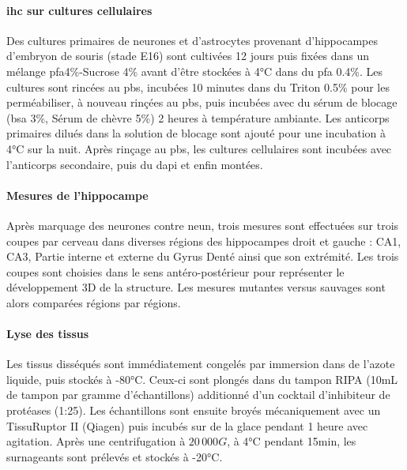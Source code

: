 \paragraph{\Acrlong{ihc} sur cultures cellulaires}
\label{par:ihcculture}
	Des cultures primaires de neurones et d'astrocytes provenant d'hippocampes d'embryon de  souris (stade E16) sont cultivées 12 jours puis fixées dans un mélange \gls{pfa}4\%-Sucrose 4\% avant d'être stockées à 4°C dans du \gls{pfa} 0.4\%. Les cultures sont rincées au \acrshort{pbs}, incubées 10 minutes dans du Triton 0.5\% pour les perméabiliser, à nouveau rinçées au \acrshort{pbs}, puis incubées avec du sérum de blocage (\acrshort{bsa} 3\%, Sérum de chèvre 5\%) 2 heures à température ambiante. Les anticorps primaires dilués dans la solution de blocage sont ajouté pour une incubation à 4°C sur la nuit.  Après rinçage au \acrshort{pbs}, les cultures cellulaires sont incubées avec l'anticorps secondaire, puis du \acrshort{dapi} et enfin montées.
	
\paragraph{Mesures de l'hippocampe}
\label{par:hippNeuN}
	Après marquage des neurones contre \acrshort{neun}, trois mesures sont effectuées sur trois coupes par cerveau dans diverses régions des hippocampes droit et gauche : CA1, CA3, Partie interne et externe du Gyrus Denté ainsi que son extrémité. Les trois coupes sont choisies dans le sens antéro-postérieur pour représenter le développement 3D de la structure. Les mesures mutantes versus sauvages sont alors comparées régions par régions.
	
\paragraph{Lyse des tissus}
\label{par:lyse}
	Les tissus disséqués sont immédiatement congelés par immersion dans de l'azote liquide, puis stockés à -80°C. Ceux-ci sont plongés dans du tampon RIPA (10mL de tampon par gramme d'échantillons) additionné d'un cocktail d'inhibiteur de protéases (1:25). Les échantillons sont ensuite broyés mécaniquement avec un TissuRuptor II (Qiagen\textregistered) puis incubés sur de la glace pendant 1 heure avec agitation. Après une centrifugation à $20\,000G$, à 4°C pendant 15min, les surnageants sont prélevés et stockés à -20°C. 
	
